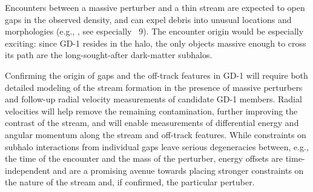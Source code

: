 \documentclass[modern]{aastex62}
\begin{document}
Encounters between a massive perturber and a thin stream are expected to open gaps in the observed density, and can expel debris into unusual locations and morphologies (e.g., \citealt{Yoon:2011}, see especially \figurename~9).
The encounter origin would be especially exciting: since GD-1 resides in the halo, the only objects massive enough to cross its path are the long-sought-after dark-matter subhalos.

Confirming the origin of gaps and the off-track features in GD-1 will require
both detailed modeling of the stream formation in the presence of massive
perturbers and follow-up radial velocity measurements of candidate GD-1 members.
Radial velocities will help remove the remaining contamination, further
improving the contrast of the stream, and will enable measurements of
differential energy and angular momentum along the stream and off-track
features.
While constraints on subhalo interactions from individual gaps leave serious
degeneracies between, e.g., the time of the encounter and the mass of the
perturber, energy offsets are time-independent and are a promising avenue
towards placing stronger constraints on the nature of the stream and, if
confirmed, the particular pertuber.





\end{document}
